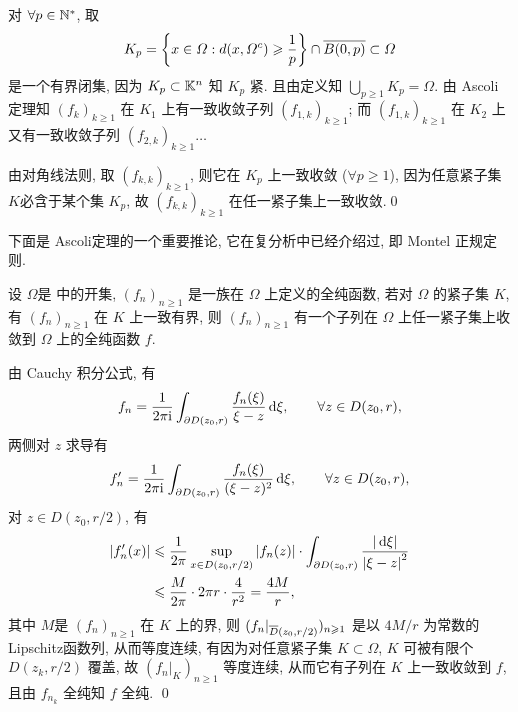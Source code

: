     \begin{Proof}
        对 $ \forall p\in\N^{*} $, 取
        \[
            K_{p}=\left\{ x\in\varOmega: d(x, \varOmega^{c})\geqslant\frac{1}{p} \right\}\cap \baro{B(0, p)}\subset\varOmega
        \]
        是一个有界闭集, 因为 $ K_{p}\subset\K^{n} $ 知 $ K_{p} $ 紧. 且由定义知 $ \bigcup_{p\geqslant1}K_{p}=\varOmega $. 由 Ascoli定理知 $ (f_{k})_{k\geqslant1} $ 在 $ K_{1} $ 上有一致收敛子列 $ (f_{1, k})_{k\geqslant1} $; 而 $ (f_{1, k})_{k\geqslant1} $ 在 $ K_{2} $ 上又有一致收敛子列 $ (f_{2, k})_{k\geqslant1}\dots $

        由对角线法则, 取 $ (f_{k, k})_{k\geqslant1} $, 则它在 $ K_{p} $ 上一致收敛 ($ \forall p\geqslant1 $), 因为任意紧子集$ K $必含于某个集 $ K_{p} $, 故 $ (f_{k, k})_{k\geqslant1} $ 在任一紧子集上一致收敛.\qed
    \end{Proof}

    下面是 Ascoli定理的一个重要推论, 它在复分析中已经介绍过, 即 Montel 正规定则.

    \begin{Theorem}[Montel]
        设 $ \varOmega $是 \C 中的开集, $ (f_{n})_{n\geqslant1} $ 是一族在 $ \varOmega $ 上定义的全纯函数, 若对 $ \varOmega $ 的紧子集 $ K $, 有 $ (f_{n})_{n\geqslant1} $ 在 $ K $ 上一致有界, 则 $ (f_{n})_{n\geqslant1} $ 有一个子列在 $ \varOmega $ 上任一紧子集上收敛到 $ \varOmega $ 上的全纯函数 $ f $.
    \end{Theorem}

    \begin{Proof}
        由 Cauchy 积分公式, 有
        \[
            f_{n}=\frac{1}{2\pi \imag}\int_{\partial D(z_{0}, r)} \frac{f_{n}(\xi)}{\xi-z}\diff \xi,\qquad \forall z\in D(z_{0}, r),
        \]
        两侧对 $ z $ 求导有
        \[
            f'_{n}=\frac{1}{2\pi \imag}\int_{\partial D(z_{0}, r)} \frac{f_{n}(\xi)}{(\xi-z)^{2}}\diff \xi,\qquad \forall z\in D(z_{0}, r),
        \]
        对 $ z\in D(z_{0}, r/2) $, 有
        \[
            \begin{aligned}
                \abs{f'_{n}(x)} & \leqslant \frac{1}{2\pi}\sup_{x\in D(z_{0}, r/2)}\abs{f_{n}(z)}\cdot\int_{\partial D(z_{0}, r)}\frac{\abs{\diff \xi}}{\abs{\xi-z}^{2}}\\
                & \leqslant \frac{M}{2\pi}\cdot 2\pi r\cdot \frac{4}{r^{2}}=\frac{4M}{r},
            \end{aligned}
        \]
        其中 $ M $是 $ (f_{n})_{n\geqslant1} $ 在 $ K $ 上的界, 则 $ (f_{n}|_{\baro{D}(z_{0}, r/2)})_{n\geqslant1} $ 是以 $ 4M/r $ 为常数的  Lipschitz函数列, 从而等度连续, 有因为对任意紧子集 $ K\subset\varOmega $,
        $ K $ 可被有限个 $ D(z_{k}, r/2) $ 覆盖, 故 $ (f_{n}|_{K})_{n\geqslant1} $ 等度连续, 从而它有子列在 $ K $ 上一致收敛到 $ f $, 且由 $ f_{n_{k}} $ 全纯知 $ f $ 全纯. \qed
    \end{Proof}

